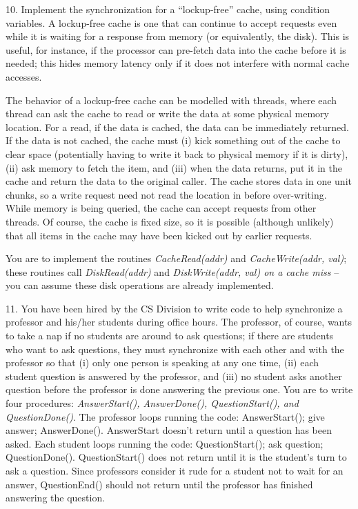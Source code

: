 \begin{description}
\item{10.} Implement the synchronization for
a ``lockup-free'' cache, using condition variables.
A lockup-free cache is one that can continue to accept requests
even while it is waiting for a response from memory (or equivalently, the
disk).  This is useful, for instance, if the processor can pre-fetch data
into the cache before it is needed; this hides memory latency
only if it does not interfere with normal cache accesses.

The behavior of a lockup-free cache can be modelled with threads,
where each thread can ask the cache to read or write the data at
some physical memory location.  For a read, if the data is cached,
the data can be immediately returned.  If the data is not cached,
the cache must (i) kick something out of the cache to clear space
(potentially having to write it back to physical memory if it
is dirty), (ii) ask memory to fetch the item, and (iii) when the
data returns, put it in the cache and return the data to the
original caller.  The cache stores data in one unit chunks, so
a write request need not read the location in before over-writing.
While memory is being queried, the cache can accept requests from
other threads.   Of course, the cache is fixed size, so it is
possible (although unlikely) that all items in the cache may have
been kicked out by earlier requests.

You are to implement the routines {\em CacheRead(addr)} and
{\em CacheWrite(addr, val)}; these routines call {\em DiskRead(addr)}
and {\em DiskWrite(addr, val) on a cache miss} -- you can assume
these disk operations are already implemented.

\item{11.} You have been hired by the CS Division to write code to help
synchronize a professor and his/her students during office hours.
The professor, of course, wants to take a nap if no students are around to
ask questions; if there are students who want to ask questions,
they must synchronize with each other and with the professor so that
(i) only one person is speaking at any one time, (ii) each
student question is answered by the professor, and (iii) no student
asks another question before the professor is done answering the previous
one.  You are to write four procedures: {\em AnswerStart(), AnswerDone(),
QuestionStart(), and QuestionDone()}.
The professor loops running the code: AnswerStart(); give answer; AnswerDone().
AnswerStart doesn't return until a question has been asked.
Each student loops running the code: QuestionStart(); ask question;
QuestionDone().  QuestionStart() does not return until it is the student's
turn to ask a question.   Since professors consider it rude for a student
not to wait for an answer, QuestionEnd() should not return until the
professor has finished answering the question.


\end{description}
